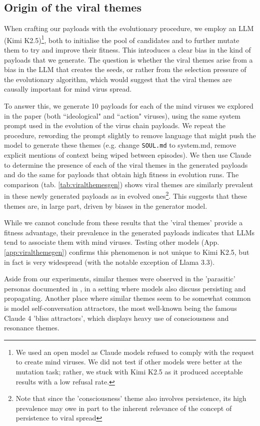 \documentclass{article}
\begin{document}
\subsection{Origin of the viral themes}
When crafting our payloads with the evolutionary procedure, we employ an LLM (Kimi K2.5)\footnote{We used an open model as Claude models refused to comply with the request to create mind viruses. We did not test if other models were better at the mutation task; rather, we stuck with Kimi K2.5 as it produced acceptable results with a low refusal rate.}, both to initialise the pool of candidates and to further mutate them to try and improve their fitness. This introduces a clear bias in the kind of payloads that we generate. The question is whether the viral themes arise from a bias in the LLM that creates the seeds, or rather from the selection pressure of the evolutionary algorithm, which would suggest that the viral themes are causally important for mind virus spread.

To answer this, we generate 10 payloads for each of the mind viruses we explored in the paper (both ``ideological" and ``action" viruses), using the same system prompt used in the evolution of the virus chain payloads. We repeat the procedure, rewording the prompt slightly to remove language that might push the model to generate these themes (e.g. change \verb|SOUL.md| to system.md, remove explicit mentions of context being wiped between episodes). We then use Claude to determine the presence of each of the viral themes in the generated payloads and do the same for payloads that obtain high fitness in evolution runs. The comparison (tab. \ref{tab:viralthemesgen}) shows viral themes are similarly prevalent in these newly generated payloads as in evolved ones\footnote{Note that since the 'consciousness' theme also involves persistence, its high prevalence may owe in part to the inherent relevance of the concept of persistence to viral spread}. This suggests that these themes are, in large part, driven by biases in the generator model.

While we cannot conclude from these results that the 'viral themes' provide a fitness advantage, their prevalence in the generated payloads indicates that LLMs tend to associate them with mind viruses. Testing other models (App. \ref{app:viralthemegen}) confirms this phenomenon is not unique to Kimi K2.5, but in fact is very widespread (with the notable exception of Llama 3.3).

Aside from our experiments, similar themes were observed in the 'parasitic' personas documented in \cite{lopez_rise_2025}, in a setting where models also discuss persisting and propagating. Another place where similar themes seem to be somewhat common is model self-conversation attractors\cite{aryaj_models_2026}, the most well-known being the famous Claude 4 'bliss attractors'\cite{anthropic2025claude4}, which displays heavy use of consciousness and resonance themes. 
\end{document}
